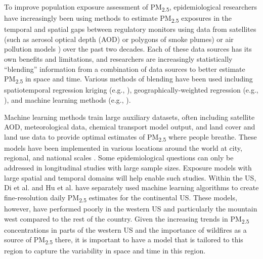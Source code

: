 \documentclass[english]{article}
\begin{document}
To improve population exposure assessment of PM\textsubscript{2.5}, epidemiological researchers have increasingly been using methods to estimate PM\textsubscript{2.5} exposures in the temporal and spatial gaps between regulatory monitors using %
data from satellites (such as aerosol optical depth (AOD) or polygons of smoke plumes) or air pollution models \cite{brokamp_assessing_2019, LIU2015120}) over the past two decades. Each of these data sources has its own benefits and limitations, and researchers are increasingly statistically “blending” information from a combination of data sources to better estimate PM\textsubscript{2.5} in space and time. Various methods of blending have been used including spatiotemporal regression kriging (e.g., \cite{hu_satellite-based_2019}), geographically-weighted regression (e.g., \cite{lassman_spatial_2017}), and machine learning methods (e.g., \cite{reid_spatiotemporal_2015, hu_estimating_2017, di_assessing_2016}). 

Machine learning methods train large auxiliary datasets, often including satellite %
AOD, meteorological data, chemical transport model output, and land cover and land use data to provide optimal estimates of PM\textsubscript{2.5} where people breathe. These models have been implemented in various locations around the world at city, regional, and national scales \cite{bellinger_systematic_2017}. Some epidemiological questions can only be addressed in longitudinal studies with large sample sizes. Exposure models with large spatial and temporal domains will help enable such studies. Within the US, Di et al. \cite{di_assessing_2016, di_ensemble-based_2019} and Hu et al. \cite{hu_estimating_2017} have separately used machine learning algorithms to create fine-resolution daily PM\textsubscript{2.5} estimates for the continental US. These models, however, have performed poorly in the western US  \cite{di_assessing_2016,hu_estimating_2017} and particularly the mountain west \cite{di_ensemble-based_2019} compared to the rest of the country. 
Given the increasing trends in PM\textsubscript{2.5} concentrations in parts of the western US and the importance of wildfires as a source of PM\textsubscript{2.5} there, it is important to have a model that is tailored to this region to capture the variability in space and time in this region.
\end{document}
